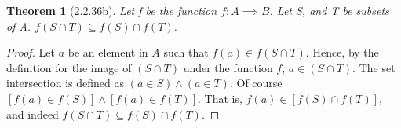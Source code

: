 \documentclass[a4paper, 12pt]{article}
\theoremstyle{plain}
\newtheorem*{theorem*}{Theorem}
\begin{document}
	
	\begin{theorem*}[2.2.36b]
		Let f be the function $f: A \implies B$. Let S, and T be subsets of A. 
		$f(S \cap T) \subseteq f(S) \cap f(T)$.
	\end{theorem*}
	
	\begin{proof}
		Let $a$ be an element in $A$ such that $f(a) \in f(S \cap T)$. Hence, by the definition 
		for the image of $(S \cap T)$ under the function $f$, $a \in (S \cap T)$. The set 
		intersection is defined as $(a \in S) \land (a \in T)$. Of course \newline 
		$[f(a) \in f(S)] \land [f(a) \in f(T)]$. That is, $f(a) \in [f(S) \cap f(T)]$, and indeed 
		$f(S \cap T) \subseteq f(S) \cap f(T)$.
	\end{proof}
\end{document}
